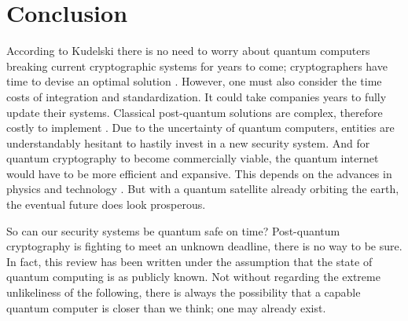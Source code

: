 \section{Conclusion}
According to Kudelski there is no need to worry about quantum computers breaking current cryptographic systems for years to come; cryptographers have time to devise an optimal solution \cite{Impact_QC_Cryptog}. However, one must also consider the time costs of integration and standardization. It could take companies years to fully update their systems. Classical post-quantum solutions are complex, therefore costly to implement \cite{Sec_Risk}. Due to the uncertainty of quantum computers, entities are understandably hesitant to hastily invest in a new security system. And for quantum cryptography to become commercially viable, the quantum internet would have to be more efficient and expansive. This depends on the advances in physics and technology \cite{Q_Cryptog}. But with a quantum satellite already orbiting the earth, the eventual future does look prosperous.

So can our security systems be quantum safe on time? Post-quantum cryptography is fighting to meet an unknown deadline, there is no way to be sure. In fact, this review has been written under the assumption that the state of quantum computing is as publicly known. Not without regarding the extreme unlikeliness of the following, there is always the possibility that a capable quantum computer is closer than we think; one may already exist. 
